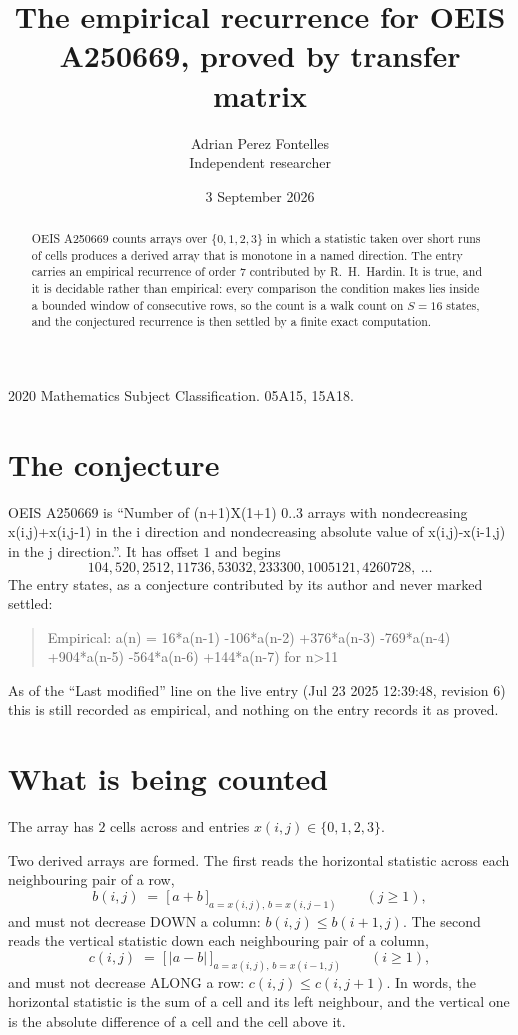 \documentclass[11pt,a4paper]{article}
\title{The empirical recurrence for OEIS A250669, proved by transfer matrix}
\author{Adrian Perez Fontelles\\ \small Independent researcher}
\date{3 September 2026}
\theoremstyle{plain}
\theoremstyle{definition}
\begin{document}
\maketitle

\begin{abstract}
OEIS A250669 counts arrays over $\{0,1,2,3\}$ in which a statistic taken over short runs
of cells produces a derived array that is monotone in a named direction. The entry carries an
empirical recurrence of order $7$ contributed by R.~H.~Hardin. It is true, and it is
decidable rather than empirical: every comparison the condition makes lies inside a bounded
window of consecutive rows, so the count is a walk count on $S=16$ states, and the
conjectured recurrence is then settled by a finite exact computation.
\end{abstract}

\noindent\small 2020 Mathematics Subject Classification. 05A15, 15A18.\normalsize

\section{The conjecture}

OEIS A250669 is ``Number of (n+1)X(1+1) 0..3 arrays with nondecreasing x(i,j)+x(i,j-1) in the i direction and nondecreasing absolute value of x(i,j)-x(i-1,j) in the j direction.''. It has offset $1$ and begins
\[
104, 520, 2512, 11736, 53032, 233300, 1005121, 4260728,\ \dots
\]
The entry states, as a conjecture contributed by its author and never marked settled:
\begin{quote}
Empirical: a(n) = 16*a(n-1) -106*a(n-2) +376*a(n-3) -769*a(n-4) +904*a(n-5) -564*a(n-6) +144*a(n-7) for n>11
\end{quote}
As of the ``Last modified'' line on the live entry (Jul 23 2025 12:39:48, revision 6) this is still
recorded as empirical, and nothing on the entry records it as proved.

\section{What is being counted}

The array has $2$ cells across and entries $x(i,j)\in\{0,1,2,3\}$.

Two derived arrays are formed. The first reads the horizontal statistic across each
neighbouring pair of a row,
\[
b(i,j)\;=\;\bigl[\,a+b\,\bigr]_{a=x(i,j),\,b=x(i,j-1)}\qquad (j\ge1),
\]
and must not decrease DOWN a column: $b(i,j)\le b(i{+}1,j)$. The second reads the vertical
statistic down each neighbouring pair of a column,
\[
c(i,j)\;=\;\bigl[\,\lvert a-b\rvert\,\bigr]_{a=x(i,j),\,b=x(i{-}1,j)}\qquad (i\ge1),
\]
and must not decrease ALONG a row: $c(i,j)\le c(i,j{+}1)$. In words, the horizontal statistic
is the sum of a cell and its left neighbour, and the vertical one is
the absolute difference of a cell and the cell above it.
\end{document}
